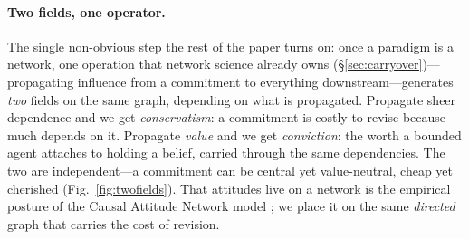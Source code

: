 \documentclass[11pt]{article}
\begin{document}
\paragraph{Two fields, one operator.}
The single non-obvious step the rest of the paper turns on: once a paradigm is a network, one
operation that network science already owns (\S\ref{sec:carryover})---propagating influence from a
commitment to everything downstream---generates \emph{two} fields on the same graph, depending on
what is propagated. Propagate sheer dependence and we get
\emph{conservatism}: a commitment is costly to revise because much depends on it. Propagate
\emph{value} and we get \emph{conviction}: the worth a bounded agent attaches to holding a belief,
carried through the same dependencies. The two are independent---a commitment can be central yet
value-neutral, cheap yet cherished (Fig.~\ref{fig:twofields}). That attitudes live on a network is
the empirical posture of the Causal Attitude Network model \citep{dalege2016}; we place it on the
same \emph{directed} graph that carries the cost of revision.
\end{document}
